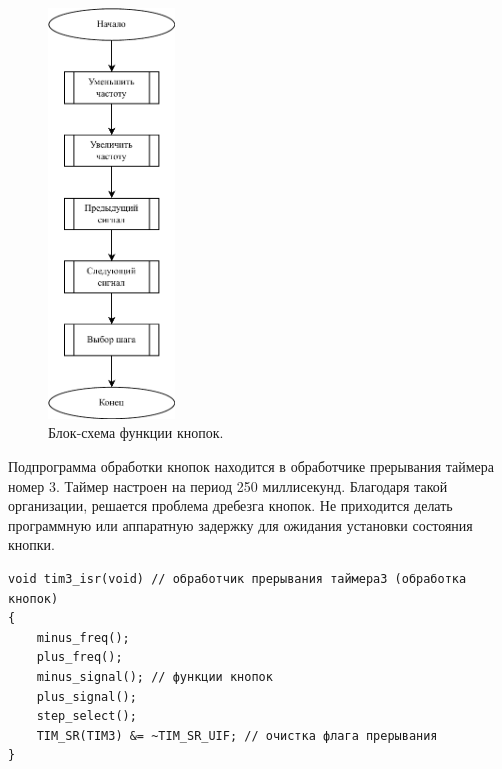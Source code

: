 	\begin{figure}[H]
    \centering
    \includegraphics[width=0.3\textwidth]{../image/buttons.pdf}
    \caption{Блок-схема функции кнопок.}
	\end{figure}
	
	Подпрограмма обработки кнопок находится в обработчике прерывания таймера номер 3. Таймер настроен на период 250 миллисекунд. Благодаря такой организации, решается проблема дребезга кнопок. Не приходится делать программную или аппаратную задержку для ожидания установки состояния кнопки.

\begin{code}
\begin{verbatim}
void tim3_isr(void) // обработчик прерывания таймера3 (обработка кнопок)
{
    minus_freq();
    plus_freq();
    minus_signal(); // функции кнопок
    plus_signal();
    step_select();
    TIM_SR(TIM3) &= ~TIM_SR_UIF; // очистка флага прерывания
}
\end{verbatim}
\end{code}
	
